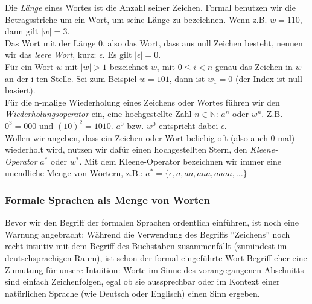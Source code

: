 \noindent
Die \emph{Länge} eines Wortes ist die Anzahl seiner Zeichen.
Formal benutzen wir die Betragsstriche um ein Wort, um seine
Länge zu bezeichnen. Wenn z.B. $w = 110$, dann gilt $|w| = 3$.\\

\noindent
Das Wort mit der Länge 0, also das Wort, dass aus null Zeichen besteht,
nennen wir das \emph{leere Wort}, kurz: $\epsilon$.
Es gilt $|\epsilon| = 0$.\\

\noindent
Für ein Wort $w$ mit $|w| > 1$ bezeichnet $w_i$ mit $0 \leq i < n$
genau das Zeichen in $w$ an der i-ten Stelle.
Sei zum Beispiel $w = 101$, dann ist $w_1 = 0$ (der Index ist null-basiert).\\

\noindent
Für die n-malige Wiederholung eines Zeichens oder Wortes führen wir den \emph{Wiederholungsoperator}
ein, eine hochgestellte Zahl $n \in \mathbb{N}$: $a^n$ oder $w^n$.
Z.B. $0^3 = 000$ und $(10)^2 = 1010$.
$a^0$ bzw. $w^0$ entspricht dabei $\epsilon$.\\

\noindent
Wollen wir angeben, dass ein Zeichen oder Wort beliebig oft (also auch 0-mal) wiederholt
wird, nutzen wir dafür einen hochgestellten Stern, den \emph{Kleene-Operator} $a^*$ oder $w^*$.
Mit dem Kleene-Operator bezeichnen wir immer eine unendliche Menge von Wörtern, z.B.:
$a^* = \{\epsilon, a, aa, aaa, aaaa, \dots\}$

\subsubsection{Formale Sprachen als Menge von Worten}

Bevor wir den Begriff der formalen Sprachen ordentlich einführen,
ist noch eine Warnung angebracht:
Während die Verwendung des Begriffs ''Zeichens''
noch recht intuitiv mit dem Begriff des Buchstaben zusammenfällt
(zumindest im deutschsprachigen Raum),
ist schon der formal eingeführte Wort-Begriff eher eine Zumutung für unsere Intuition:
Worte im Sinne des vorangegangenen Abschnitts sind einfach Zeichenfolgen,
egal ob sie aussprechbar oder im Kontext einer natürlichen Sprache
(wie Deutsch oder Englisch) einen Sinn ergeben.


